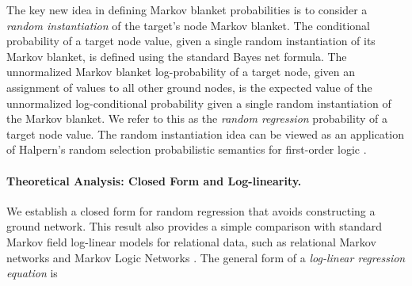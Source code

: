 \documentclass[twoside,leqno,twocolumn]{article}
\begin{document}
The key new idea in defining Markov blanket probabilities is to consider a {\em random instantiation} of the target's node Markov blanket. 
The conditional probability of a target node value, given a single random instantiation of its Markov blanket, is defined using the standard Bayes net formula.
The unnormalized Markov blanket log-probability of a target node, given an assignment of  values to all other ground nodes, is the expected value of the unnormalized log-conditional probability given a single random instantiation of the Markov blanket. We refer to this as the {\em random regression} probability of a target node value. The random instantiation idea can be viewed as an application of Halpern's random selection probabilistic semantics for first-order logic \cite{Schulte2011,Halpern90}. 


\paragraph{Theoretical Analysis: Closed Form and Log-linearity.}
We establish a closed form for random regression that avoids constructing a ground network.
This result also provides a simple comparison with standard Markov field log-linear models for relational data, such as relational Markov networks \cite{Taskar2002} and Markov Logic Networks \cite{Domingos2009}. 
%
The general form of a {\em log-linear regression equation} is
\end{document}
